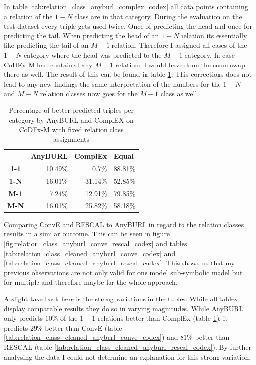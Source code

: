 In table \ref{tab:relation_class_anyburl_complex_codex} all data points containing a relation of the $1-N$ class are in that category. During the evaluation on the test dataset every triple gets used twice. Once of predicting the head and once for predicting the tail. When predicting the head of an $1-N$ relation its essentially like predicting the tail of an $M-1$ relation. Therefore I assigned all cases of the $1-N$ category where the head was predicted to the $M-1$ category. In case CoDEx-M had contained any $M-1$ relations I would have done the same swap there as well. The result of this can be found in table \ref{tab:relation_class_cleaned_anyburl_complex_codex}. This corrections does not lead to any new findings the same interpretation of the numbers for the $1-N$ and $M-N$ relation classes now goes for the $M-1$ class as well.

\begin{table}[H]
\centering
\begin{tabular}{c|rrr}
\multicolumn{1}{l|}{} & \multicolumn{1}{c}{\textbf{AnyBURL}} & \multicolumn{1}{c}{\textbf{ComplEx}} & \multicolumn{1}{l}{\textbf{Equal}} \\ \hline
\textbf{1-1} & 10.49\% & 0.7\% & 88.81\% \\
\textbf{1-N} & 16.01\% & 31.14\% & 52.85\% \\
\textbf{M-1} & 7.24\% & 12.91\% & 79.85\% \\
\textbf{M-N} & 16.01\% & 25.82\% & 58.18\%
\end{tabular}
\caption{Percentage of better predicted triples per category by AnyBURL and ComplEX on CoDEx-M with fixed relation class assignments}
\label{tab:relation_class_cleaned_anyburl_complex_codex}
\end{table}

Comparing ConvE and RESCAL to AnyBURL in regard to the relation classes results in a similar outcome. This can be seen in figure \ref{fig:relation_class_anyburl_conve_rescal_codex} and tables \ref{tab:relation_class_cleaned_anyburl_conve_codex} and \ref{tab:relation_class_cleaned_anyburl_rescal_codex}. This shows us that my previous observations are not only valid for one model sub-symbolic model but for multiple and therefore maybe for the whole approach.

A slight take back here is the strong variations in the tables. While all tables display comparable results they do so in varying magnitudes. While AnyBURL only predicts $10\%$ of the $1-1$ relations better than ComplEx (table \ref{tab:relation_class_cleaned_anyburl_complex_codex}), it predicts $29\%$ better than ConvE (table \ref{tab:relation_class_cleaned_anyburl_conve_codex}) and $81\%$ better than RESCAL (table \ref{tab:relation_class_cleaned_anyburl_rescal_codex}). By further analysing the data I could not determine an explanation for this strong variation.

